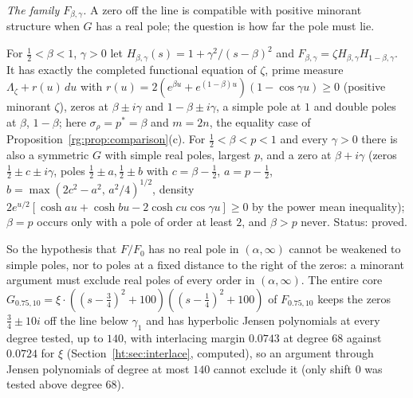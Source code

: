 \emph{The family $F_{\beta,\gamma}$.} A zero off the line is compatible with positive minorant structure when $G$ has a real pole; the question is how far the pole must lie.

\begin{theorem}\label{rg:thm:Fbg}
For $\frac12<\beta<1$, $\gamma>0$ let $H_{\beta,\gamma}(s)=1+\gamma^2/(s-\beta)^2$ and $F_{\beta,\gamma}=\zeta H_{\beta,\gamma}H_{1-\beta,\gamma}$. It has exactly the completed functional equation of $\zeta$, prime measure $\Lambda_\zeta+r(u)\,du$ with $r(u)=2(e^{\beta u}+e^{(1-\beta)u})(1-\cos\gamma u)\ge0$ (positive minorant $\zeta$), zeros at $\beta\pm i\gamma$ and $1-\beta\pm i\gamma$, a simple pole at $1$ and double poles at $\beta$, $1-\beta$; here $\sigma_\rho=p^*=\beta$ and $m=2n$, the equality case of Proposition~\ref{rg:prop:comparison}(c). For $\frac12<\beta<p<1$ and every $\gamma>0$ there is also a symmetric $G$ with simple real poles, largest $p$, and a zero at $\beta+i\gamma$ (zeros $\frac12\pm c\pm i\gamma$, poles $\frac12\pm a,\frac12\pm b$ with $c=\beta-\frac12$, $a=p-\frac12$, $b=\max(2c^2-a^2,\,a^2/4)^{1/2}$, density $2e^{u/2}[\cosh au+\cosh bu-2\cosh cu\cos\gamma u]\ge0$ by the power mean inequality); $\beta=p$ occurs only with a pole of order at least $2$, and $\beta>p$ never. Status: proved.
\end{theorem}

So the hypothesis that $F/F_0$ has no real pole in $(\alpha,\infty)$ cannot be weakened to simple poles, nor to poles at a fixed distance to the right of the zeros: a minorant argument must exclude real poles of every order in $(\alpha,\infty)$. The entire core $G_{0.75,10}=\xi\cdot((s-\frac34)^2+100)((s-\frac14)^2+100)$ of $F_{0.75,10}$ keeps the zeros $\frac34\pm10i$ off the line below $\gamma_1$ and has hyperbolic Jensen polynomials at every degree tested, up to $140$, with interlacing margin $0.0743$ at degree $68$ against $0.0724$ for $\xi$ (Section~\ref{ht:sec:interlace}, computed), so an argument through Jensen polynomials of degree at most $140$ cannot exclude it (only shift $0$ was tested above degree $68$).

